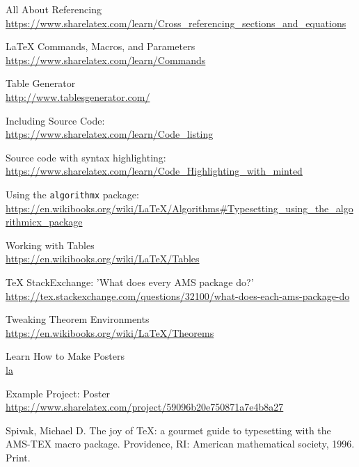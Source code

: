 \documentclass[11pt,letterpaper,titlepage]{article}
\numberwithin{equation}{section}
\numberwithin{figure}{section}
\numberwithin{table}{section}
\numberwithin{algorithm}{section}
\theoremstyle{definition}
\begin{document}
\begin{thebibliography}{20}

All About Referencing\\
\url{https://www.sharelatex.com/learn/Cross\_referencing\_sections\_and\_equations}

{\LaTeX} Commands, Macros, and Parameters\\
\url{https://www.sharelatex.com/learn/Commands}

Table Generator\\
\url{http://www.tablesgenerator.com/}

Including Source Code:\\
\url{https://www.sharelatex.com/learn/Code\_listing}

Source code with syntax highlighting:\\ \url{https://www.sharelatex.com/learn/Code\_Highlighting\_with\_minted}

Using the \verb$algorithmx$ package:
\url{https://en.wikibooks.org/wiki/LaTeX/Algorithms#Typesetting_using_the_algorithmicx_package}

Working with Tables\\ \url{https://en.wikibooks.org/wiki/LaTeX/Tables}

{\TeX} StackExchange: 'What does every AMS package do?'\\ \url{https://tex.stackexchange.com/questions/32100/what-does-each-ams-package-do}

Tweaking Theorem Environments\\ \url{https://en.wikibooks.org/wiki/LaTeX/Theorems}

Learn How to Make Posters\\
\url{la}

Example Project: Poster\\
\url{https://www.sharelatex.com/project/59096b20e750871a7e4b8a27}

Spivak, Michael D. The joy of {\TeX}: a gourmet guide to typesetting with the AMS-TEX macro package. Providence, RI: American mathematical society, 1996. Print.

\end{thebibliography}
\end{document}
